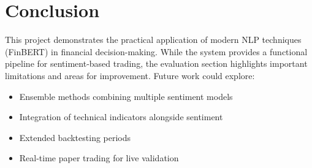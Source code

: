 \documentclass[12pt]{article}
\begin{document}
\section{Conclusion}

This project demonstrates the practical application of modern NLP techniques (FinBERT) in financial decision-making. While the system provides a functional pipeline for sentiment-based trading, the evaluation section highlights important limitations and areas for improvement. Future work could explore:
\begin{itemize}
\item Ensemble methods combining multiple sentiment models
\item Integration of technical indicators alongside sentiment
\item Extended backtesting periods
\item Real-time paper trading for live validation
\end{itemize}
\end{document}
